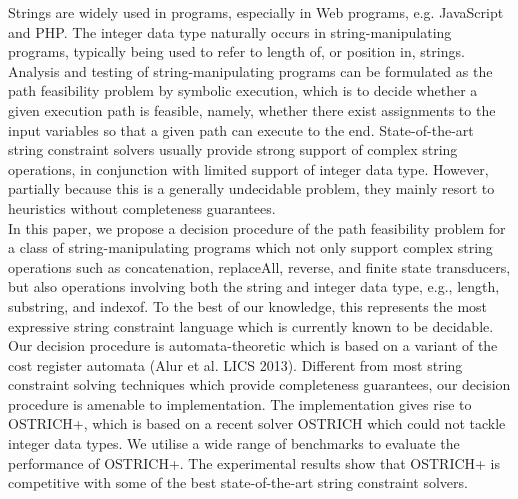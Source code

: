 
Strings are widely used in programs, especially in Web programs, e.g. JavaScript and PHP. The integer data type naturally occurs in string-manipulating programs, typically being used to refer to length of, or position in, strings. 
Analysis and testing of string-manipulating programs can be formulated as the path feasibility problem by symbolic execution, which is to decide whether a given execution path is feasible, namely, whether there exist assignments to the input variables so that a given path can execute to the end. %
State-of-the-art string constraint solvers usually provide strong support of complex string operations, in conjunction with limited support of integer data type. However, partially because this is a generally undecidable problem, %
they mainly resort to heuristics without completeness guarantees. \\
In this paper, we propose a decision procedure of the path feasibility problem for a class of string-manipulating programs
which not only support complex string operations %
such as concatenation, replaceAll, reverse, and finite state transducers, but also operations involving both the string and integer data type, e.g., length, substring, and indexof. To the best of our knowledge, this represents the most expressive string constraint language which is currently known to be decidable. 
Our decision procedure is automata-theoretic which is based on a variant of the cost register automata (Alur et al. LICS 2013). 
Different from most string constraint solving techniques which provide completeness guarantees, 
our decision procedure is amenable to implementation. 
The implementation gives rise to OSTRICH+, which  is based on a recent solver OSTRICH which could not tackle integer data types. 
We utilise a wide range of benchmarks to evaluate the performance of OSTRICH+. The experimental results show that OSTRICH+ is competitive with some of the best state-of-the-art string constraint solvers.
